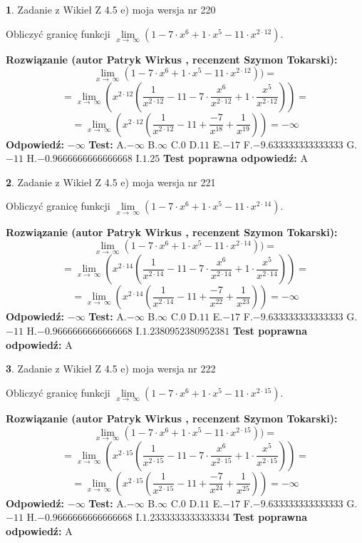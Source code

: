 \documentclass[12pt, a4paper]{article}
\theoremstyle{definition} %
\newtheorem{zad}{}
\newcommand{\zadStart}[1]{\begin{zad}#1\newline}
\newcommand{\zadStop}{\end{zad}}
\newcommand{\rozwStart}[2]{\noindent \textbf{Rozwiązanie (autor #1 , recenzent #2): }\newline}
\newcommand{\rozwStop}{\newline}
\newcommand{\odpStart}{\noindent \textbf{Odpowiedź:}\newline}
\newcommand{\odpStop}{\newline}
\newcommand{\testStart}{\noindent \textbf{Test:}\newline}
\newcommand{\testStop}{\newline}
\newcommand{\kluczStart}{\noindent \textbf{Test poprawna odpowiedź:}\newline}
\newcommand{\kluczStop}{\newline}
\begin{document}
\zadStart{Zadanie z Wikieł Z 4.5 e) moja wersja nr 220}


Obliczyć granicę funkcji  $\lim\limits_{x\to\ \infty}(1 - 7 \cdot x^{6}+1 \cdot x^{5}- 11 \cdot x^{2\cdot12})$.
\zadStop
\rozwStart{Patryk Wirkus}{Szymon Tokarski}
$$\lim\limits_{x\to\ \infty}(1 - 7 \cdot x^{6}+1 \cdot x^{5}- 11 \cdot x^{2\cdot12}))=$$
$$=\lim\limits_{x\to\ \infty}(x^{2\cdot12}(\frac{1}{x^{2\cdot12}}-11 -7 \cdot \frac{x^{6}}{x^{2\cdot12}}+1 \cdot \frac{x^{5}}{x^{2\cdot12}}))=$$
$$=\lim\limits_{x\to\ \infty}(x^{2\cdot12}(\frac{1}{x^{2\cdot12}}-11 + \frac{-7}{x^{18}}+ \frac{1}{x^{19}}))=-\infty$$
\rozwStop
\odpStart
$-\infty$
\odpStop
\testStart
A.$-\infty$ B.$\infty$ C.$0$ D.$11$ E.$-17$
F.$-9.633333333333333$ G.$-11$
H.$-0.9666666666666668$
I.$1.25$
\testStop
\kluczStart
A
\kluczStop



\zadStart{Zadanie z Wikieł Z 4.5 e) moja wersja nr 221}


Obliczyć granicę funkcji  $\lim\limits_{x\to\ \infty}(1 - 7 \cdot x^{6}+1 \cdot x^{5}- 11 \cdot x^{2\cdot14})$.
\zadStop
\rozwStart{Patryk Wirkus}{Szymon Tokarski}
$$\lim\limits_{x\to\ \infty}(1 - 7 \cdot x^{6}+1 \cdot x^{5}- 11 \cdot x^{2\cdot14}))=$$
$$=\lim\limits_{x\to\ \infty}(x^{2\cdot14}(\frac{1}{x^{2\cdot14}}-11 -7 \cdot \frac{x^{6}}{x^{2\cdot14}}+1 \cdot \frac{x^{5}}{x^{2\cdot14}}))=$$
$$=\lim\limits_{x\to\ \infty}(x^{2\cdot14}(\frac{1}{x^{2\cdot14}}-11 + \frac{-7}{x^{22}}+ \frac{1}{x^{23}}))=-\infty$$
\rozwStop
\odpStart
$-\infty$
\odpStop
\testStart
A.$-\infty$ B.$\infty$ C.$0$ D.$11$ E.$-17$
F.$-9.633333333333333$ G.$-11$
H.$-0.9666666666666668$
I.$1.2380952380952381$
\testStop
\kluczStart
A
\kluczStop



\zadStart{Zadanie z Wikieł Z 4.5 e) moja wersja nr 222}


Obliczyć granicę funkcji  $\lim\limits_{x\to\ \infty}(1 - 7 \cdot x^{6}+1 \cdot x^{5}- 11 \cdot x^{2\cdot15})$.
\zadStop
\rozwStart{Patryk Wirkus}{Szymon Tokarski}
$$\lim\limits_{x\to\ \infty}(1 - 7 \cdot x^{6}+1 \cdot x^{5}- 11 \cdot x^{2\cdot15}))=$$
$$=\lim\limits_{x\to\ \infty}(x^{2\cdot15}(\frac{1}{x^{2\cdot15}}-11 -7 \cdot \frac{x^{6}}{x^{2\cdot15}}+1 \cdot \frac{x^{5}}{x^{2\cdot15}}))=$$
$$=\lim\limits_{x\to\ \infty}(x^{2\cdot15}(\frac{1}{x^{2\cdot15}}-11 + \frac{-7}{x^{24}}+ \frac{1}{x^{25}}))=-\infty$$
\rozwStop
\odpStart
$-\infty$
\odpStop
\testStart
A.$-\infty$ B.$\infty$ C.$0$ D.$11$ E.$-17$
F.$-9.633333333333333$ G.$-11$
H.$-0.9666666666666668$
I.$1.2333333333333334$
\testStop
\kluczStart
A
\kluczStop
\end{document}
